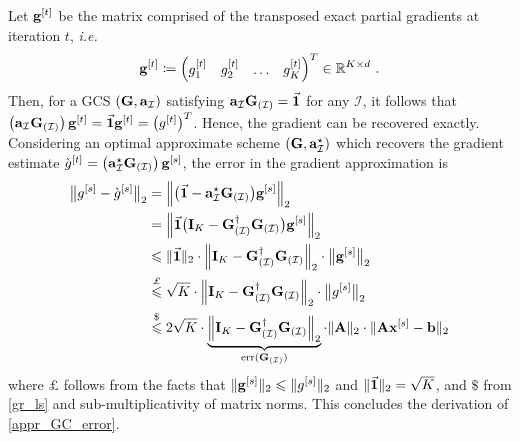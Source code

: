 \documentclass[journal,letterpaper,onecolumn,twoside,nofonttune]{IEEEtran}
\newcommand{\I}{\mathcal{I}}
\newcommand{\xb}{\bold{x}}
\newcommand{\Gb}{\bold{G}}
\newcommand{\R}{\mathbb{R}}
\newcommand{\gb}{\bold{g}}
\newcommand{\Ab}{\bold{A}}
\newcommand{\bb}{\bold{b}}
\newcommand{\ab}{\bold{a}}
\newcommand{\Ib}{\bold{I}}
\newcommand{\err}{\mathrm{err}}
\begin{document}
Let $\gb^{[t]}$ be the matrix comprised of the transposed exact partial gradients at iteration $t$, \textit{i.e.}
\begin{equation}
\label{g_matrix}
  \gb^{[t]} \coloneqq {\begin{pmatrix} g_1^{[t]} & g_2^{[t]} & \hdots & g_K^{[t]} \end{pmatrix}}^T \in \R^{K\times d}\ .
\end{equation}
Then, for a GCS $(\Gb,\ab_\I)$ satisfying $\ab_\I\Gb_{(\I)}=\vec{\bold{1}}$ for any $\I$, it follows that $\left(\ab_\I\Gb_{(\I)}\right)\gb^{[t]}=\vec{\bold{1}}\gb^{[t]}=\big(g^{[t]}\big)^T$. Hence, the gradient can be recovered exactly. Considering an optimal approximate scheme $(\Gb,\ab_\I^\star)$ which recovers the gradient estimate $\grave{g}^{[t]}=\left(\ab_\I^\star\Gb_{(\I)}\right)\gb^{[s]}$, the error in the gradient approximation is
\begin{align*}
  \big\|g^{[s]}-\grave{g}^{[s]}\big\|_2 &= \left\|\big(\vec{\bold{1}}-\ab_\I^\star\Gb_{(\I)}\big)\gb^{[s]}\right\|_2\\
  &= \left\|\vec{\bold{1}}\big(\Ib_K-\Gb_{(\I)}^{\dagger}\Gb_{(\I)}\big)\gb^{[s]}\right\|_2\\
  &\leqslant \|\vec{\bold{1}}\|_2\cdot \left\|\Ib_K-\Gb_{(\I)}^{\dagger}\Gb_{(\I)}\right\|_2\cdot\big\|\gb^{[s]}\big\|_2\\
  &\overset{\pounds}{\leqslant} \sqrt{K}\cdot \left\|\Ib_K-\Gb_{(\I)}^{\dagger}\Gb_{(\I)}\right\|_2\cdot\big\|g^{[s]}\big\|_2\\
  &\overset{\$}{\leqslant} 2\sqrt{K}\cdot\underbrace{\left\|\Ib_K-\Gb_{(\I)}^{\dagger}\Gb_{(\I)}\right\|_2}_{\err(\Gb_{(\I)})}\cdot\|\Ab\|_2\cdot\|\Ab\xb^{[s]}-\bb\|_2
\end{align*}
where $\pounds$ follows from the facts that $\|\gb^{[s]}\|_2\leqslant\|g^{[s]}\|_2$ and $\|\vec{\bold{1}}\|_2=\sqrt{K}$, and $\$$ from \eqref{gr_ls} and sub-multiplicativity of matrix norms. This concludes the derivation of \eqref{appr_GC_error}.
\end{document}
